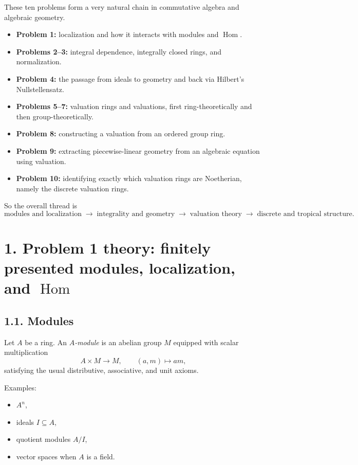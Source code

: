 \documentclass[12pt,a4paper,oneside]{report}
\theoremstyle{notespace}
\begin{document}
These ten problems form a very natural chain in commutative algebra and algebraic geometry.

\begin{itemize}
	\item \textbf{Problem 1:} localization and how it interacts with modules and \(\operatorname{Hom}\).
	\item \textbf{Problems 2--3:} integral dependence, integrally closed rings, and normalization.
	\item \textbf{Problem 4:} the passage from ideals to geometry and back via Hilbert's Nullstellensatz.
	\item \textbf{Problems 5--7:} valuation rings and valuations, first ring-theoretically and then group-theoretically.
	\item \textbf{Problem 8:} constructing a valuation from an ordered group ring.
	\item \textbf{Problem 9:} extracting piecewise-linear geometry from an algebraic equation using valuation.
	\item \textbf{Problem 10:} identifying exactly which valuation rings are Noetherian, namely the discrete valuation rings.
\end{itemize}

So the overall thread is
\[
\text{modules and localization}
\;\longrightarrow\;
\text{integrality and geometry}
\;\longrightarrow\;
\text{valuation theory}
\;\longrightarrow\;
\text{discrete and tropical structure}.
\]

\bigskip

\section{1. Problem 1 theory: finitely presented modules, localization, and \texorpdfstring{$\operatorname{Hom}$}{Hom}}

\subsection*{1.1. Modules}

Let \(A\) be a ring. An \emph{\(A\)-module} is an abelian group \(M\) equipped with scalar multiplication
\[
A\times M \to M,\qquad (a,m)\mapsto am,
\]
satisfying the usual distributive, associative, and unit axioms.

Examples:
\begin{itemize}
	\item \(A^n\),
	\item ideals \(I\subseteq A\),
	\item quotient modules \(A/I\),
	\item vector spaces when \(A\) is a field.
\end{itemize}
\end{document}
